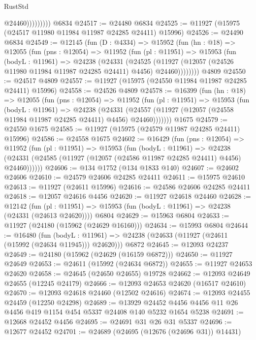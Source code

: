\begin{lexlean}{RustStd}
\begin{coremodule}
                      @24460)))))))))
    @6834
@24517 := @24480 @6834
@24525 := @11927 (@15975 (@24517 @11980 @11984 @11987 @24285 @24411) @15996)
@24526 := @24490 @6834
@24549 := @12145
    (fun (D : @4334) =>
    @15952
      (fun (hn : @18) =>
      @12055
        (fun (pns : @12054) =>
        @11952
          (fun (pl : @11951) =>
          @15953
            (fun (bodyL : @11961) =>
            @24238
              (@24331
                (@24525
                  (@11927 (@12057 (@24526 @11980 @11984 @11987 @24285 @24411) @4456) @24460))))))))
    @4809
@24550 := @24517 @4809
@24557 := @11927 (@15975 (@24550 @11984 @11987 @24285 @24411) @15996)
@24558 := @24526 @4809
@24578 := @16399
    (fun (hn : @18) =>
    @12055
      (fun (pns : @12054) =>
      @11952
        (fun (pl : @11951) =>
        @15953
          (fun (bodyL : @11961) =>
          @24238
            (@24331
              (@24557 (@11927 (@12057 (@24558 @11984 @11987 @24285 @24411) @4456) @24460)))))))
    @1675
@24579 := @24550 @1675
@24585 := @11927 (@15975 (@24579 @11987 @24285 @24411) @15996)
@24586 := @24558 @1675
@24602 := @16429
    (fun (pns : @12054) =>
    @11952
      (fun (pl : @11951) =>
      @15953
        (fun (bodyL : @11961) =>
        @24238 (@24331 (@24585 (@11927 (@12057 (@24586 @11987 @24285 @24411) @4456) @24460))))))
@24606 := @134 @1752 (@134 @1833 @140)
@24607 := @24602 @24606
@24610 := @24579 @24606 @24285 @24411
@24611 := @15975 @24610
@24613 := @11927 (@24611 @15996)
@24616 := @24586 @24606 @24285 @24411
@24618 := @12057 @24616 @4456
@24620 := @11927 @24618 @24460
@24628 := @12142
    (fun (pl : @11951) => @15953 (fun (bodyL : @11961) => @24238 (@24331 (@24613 @24620))))
    @6804
@24629 := @15963 @6804
@24633 := @11927 (@24180 (@15962 (@24629 @16160)))
@24634 := @15993 @6804
@24644 := @16480
    (fun (bodyL : @11961) => @24238 (@24633 (@11927 (@24611 (@15992 (@24634 @11945))) @24620)))
    @6872
@24645 := @12093 @24237
@24649 := @24180 (@15962 (@24629 (@16159 @6872)))
@24650 := @11927 @24649
@24653 := @24611 (@15992 (@24634 @6872))
@24655 := @11927 @24653 @24620
@24658 := @24645 (@24650 @24655) @19728
@24662 := @12093 @24649 @24655 (@12245 @24179)
@24666 := @12093 @24653 @24620 (@16517 @24610)
@24670 := @12093 @24618 @24460 (@12502 @24616)
@24674 := @12093 @24455 @24459 (@12250 @24298)
@24689 := @13929
    @24452
    @4456
    @4456
    @11
    @26
    @4456
    @419
    @1154
    @454
    @5337
    @24408
    @140
    @5232
    @1654
    @5238
@24691 := @12668 @24452 @4456
@24695 := @24691 @31 @26 @31 @5337
@24696 := @12677 @24452
@24701 := @24689 (@24695 (@12676 (@24696 @31)) @14431)

\end{coremodule}
\end{lexlean}
